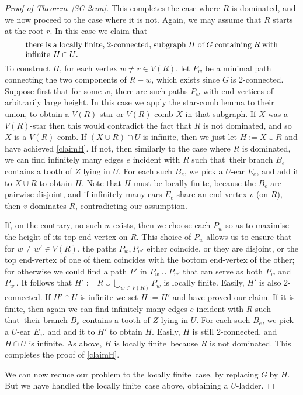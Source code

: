 \documentclass{article}
\newcommand{\g}{\ensuremath{G\ }}
\newcommand{\Tr}[1]{Theorem~\ref{#1}}
\newcommand{\lf}{locally finite}
\newcommand{\st}{such that}
\newcommand{\labtequ}[2]{\begin{equation} \label{#1} 	\begin{minipage}[c]{0.9\textwidth}  #2 \end{minipage} \ignorespacesafterend \end{equation} }
\begin{document}
\begin{proof}[Proof of \Tr{SC 2con}]
\medskip
This completes the case where $R$ is dominated, and we now proceed to the case where it is not. Again,  we may assume that $R$ starts at the root $r$. In this case we claim that 
\labtequ{claimH}{there is a \lf, 2-connected, subgraph $H$ of $G$ containing $R$ with infinite $H\cap U$.} 
To construct $H$, for each vertex $w\neq r\in V(R)$, let $P_w$ be a minimal path connecting the two components of $R - w$, which exists since \g is 2-connected. 
Suppose first that for some $w$, there are
such paths $P_w$ with end-vertices of arbitrarily large height. In this case we apply the star-comb lemma to their union, to obtain a $V(R)$-star or $V(R)$-comb $X$ in that subgraph. If $X$ was a $V(R)$-star then this would contradict the fact that $R$ is not dominated, and so $X$ is a $V(R)$-comb. If $(X \cup R)\cap U$ is infinite, then we just let $H:=  X \cup R$ and have achieved \eqref{claimH}. If not, then similarly to the case where $R$ is dominated, we can find infinitely many edges $e$ incident with $R$ \st\ their branch $B_e$ contains a tooth of $Z$ lying in $U$. For each such $B_e$, we pick a $U$-ear $E_e$, and add it to $X \cup R$ to obtain $H$.
Note that $H$ must be locally finite, because the $B_e$ are pairwise disjoint, and  if infinitely many ears $E_e$ share an end-vertex $v$ (on $R$), then $v$ dominates $R$, contradicting our assumption. 

If, on the contrary, no such $w$ exists, then we choose each $P_w$ so as to maximise the height of its top end-vertex on $R$. This choice of $P_w$ allows us to ensure that for $w\neq w' \in V(R)$, the paths $P_w, P_{w'}$ either coincide, or they are disjoint, or the top end-vertex of one of them coincides with the bottom end-vertex of the other; for otherwise we could find a path $P'$ in $P_w \cup P_{w'}$ that can serve as both $P_w$ and  $P_{w'}$. It follows that $H':= R \cup \bigcup_{w\in V(R)} P_w$ is \lf. Easily, $H'$ is also 2-connected. If $H'\cap U$ is infinite we set $H:= H'$ and have proved our claim. If it is finite, then again we can find infinitely many edges $e$ incident with $R$ \st\ their branch $B_e$ contains a tooth of $Z$ lying in $U$. For each such $B_e$, we pick a $U$-ear $E_e$, and add it to $H'$ to obtain $H$. Easily, $H$ is still  2-connected, and $H\cap U$ is infinite. As above, $H$ is \lf\ because $R$ is not dominated. This completes the proof of \eqref{claimH}.




We can now reduce our problem to the \lf\ case, by replacing \g by $H$. But we have handled the \lf\ case above, obtaining a $U$-ladder.
\end{proof}
\end{document}
